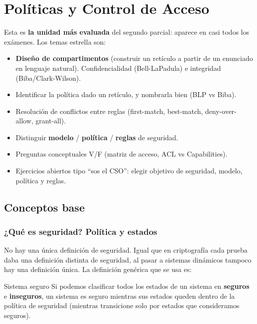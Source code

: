 \documentclass[../main.tex]{subfiles}
\begin{document}
\section{Políticas y Control de Acceso}

\begin{examen}
Esta es \textbf{la unidad más evaluada} del segundo parcial: aparece en casi todos los exámenes. Los temas estrella son:
\begin{itemize}[nosep]
  \item \textbf{Diseño de compartimentos} (construir un retículo a partir de un enunciado en lenguaje natural). Confidencialidad (Bell-LaPadula) e integridad (Biba/Clark-Wilson).
  \item Identificar la política dado un retículo, y nombrarla bien (BLP vs Biba).
  \item Resolución de conflictos entre reglas (first-match, best-match, deny-over-allow, grant-all).
  \item Distinguir \textbf{modelo} / \textbf{política} / \textbf{reglas} de seguridad.
  \item Preguntas conceptuales V/F (matriz de acceso, ACL vs Capabilities).
  \item Ejercicios abiertos tipo ``sos el CSO'': elegir objetivo de seguridad, modelo, política y reglas.
\end{itemize}
\end{examen}

\subsection{Conceptos base}

\subsubsection{¿Qué es seguridad? Política y estados}

No hay una única definición de seguridad. Igual que en criptografía cada prueba daba una definición distinta de seguridad, al pasar a sistemas dinámicos tampoco hay una definición única. La definición genérica que se usa es:

\begin{definicion}{Sistema seguro}
Si podemos clasificar todos los estados de un sistema en \textbf{seguros} e \textbf{inseguros}, un sistema es seguro mientras sus estados queden dentro de la política de seguridad (mientras transicione solo por estados que consideramos seguros).
\end{definicion}
\end{document}
